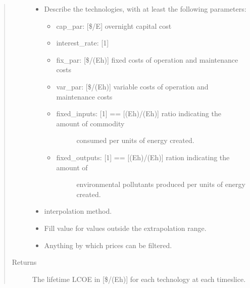\documentclass[letterpaper,10pt,english]{sphinxmanual}
\begin{document}
\begin{fulllineitems}
\begin{quote}
\begin{description}
\begin{itemize}
\item {} 
 \textendash{} 
Describe the technologies, with at least the following parameters:
\begin{itemize}
\item {} 
cap\_par: {[}\$/E{]} overnight capital cost

\item {} 
interest\_rate: {[}1{]}

\item {} 
fix\_par: {[}\$/(Eh){]} fixed costs of operation and maintenance costs

\item {} 
var\_par: {[}\$/(Eh){]} variable costs of operation and maintenance costs

\item {} \begin{description}
\item[{fixed\_inputs: {[}1{]} == {[}(Eh)/(Eh){]} ratio indicating the amount of commodity}] \leavevmode
consumed per units of energy created.

\end{description}

\item {} \begin{description}
\item[{fixed\_outputs: {[}1{]} == {[}(Eh)/(Eh){]} ration indicating the amount of}] \leavevmode
environmental pollutants produced per units of energy created.

\end{description}

\end{itemize}


\item {} 
 \textendash{} interpolation method.

\item {} 
 \textendash{} Fill value for values outside the extrapolation range.

\item {} 
 \textendash{} Anything by which prices can be filtered.

\end{itemize}

\item[{Returns}] \leavevmode
The lifetime LCOE in {[}\$/(Eh){]} for each technology at each timeslice.

\end{description}\end{quote}

\end{fulllineitems}
\end{document}
